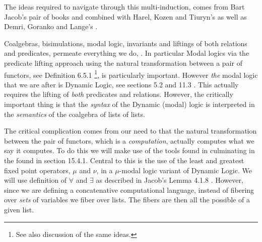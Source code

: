 The ideas required to navigate through this multi-induction, comes from 
Bart Jacob's pair of books \cite{jacobs1999categoricalLogicTypeTheory} and 
\cite{jacobs2017coalgebras} combined with Harel, Kozen and Tiuryn's 
\cite{harelKozenTiuryn2000dynamicLogic} as well as Demri, Goranko and 
Lange's \cite{demriGorankoLange2016temporalLogics}. 

Coalgebras, bisimulations, modal logic, invariants and liftings of both 
relations and predicates, permeate everything we do, 
\cite{jacobs2017coalgebras}. In particular Modal logics via the predicate 
lifting approach using the natural transformation between a pair of 
functors, see Definition 6.5.1 \cite{jacobs2017coalgebras}\footnote{See 
also \cite{kupkePattinson2011coalgModalLogics} discussion of the same 
ideas.}, is particularly important. However \emph{the} modal logic that we 
are after is Dynamic Logic, see sections 5.2 and 11.3 
\cite{harelKozenTiuryn2000dynamicLogic}. This  actually 
requires the lifting of \emph{both} predicates and relations. However, the 
critically important thing is that the \emph{syntax} of the Dynamic 
(modal) logic is interpreted in the \emph{semantics} of the coalgebra of 
lists of lists. 

The critical complication comes from our need to  that the 
natural transformation between the pair of functors, which is a 
\emph{computation}, actually computes what we say it computes. To do this 
we will make use of the tools found in 
\cite{demriGorankoLange2016temporalLogics} culminating in the 
 found in section 
15.4.1. Central to this is the use of the least and greatest fixed point 
operators, $\mu$ and $\nu$, in a $\mu$-modal logic variant of Dynamic 
Logic. We will use  definition of $\forall$ 
and $\exists$ as described in Jacob's Lemma 4.1.8 
\cite{jacobs1999categoricalLogicTypeTheory}. However, since we are 
defining a concatenative computational language, instead of fibering over 
\emph{sets} of variables we fiber over lists. The fibers are then all the 
possible  of a given list. 

